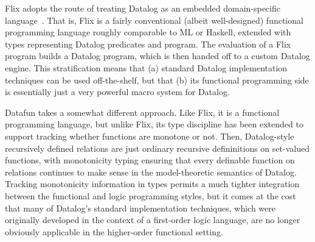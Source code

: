 %
%
%
%
%
%
%
Flix adopts the route of treating Datalog as an embedded
domain-specific language~\cite{edsl}. That is, Flix is a fairly conventional
(albeit well-designed) functional programming language roughly
comparable to ML or Haskell, extended with types representing Datalog
predicates and program. The evaluation of a Flix program builds a
Datalog program, which is then handed off to a custom Datalog engine.
This stratification means that (a) standard Datalog implementation
techniques can be used off-the-shelf, but that (b) its functional
programming side is essentially just a very powerful macro system for
Datalog.

Datafun takes a somewhat different approach. Like Flix, it is a
functional programming language, but unlike Flix, its type discipline
has been extended to support tracking whether functions are monotone
or not. Then, Datalog-style recursively defined relations are just
ordinary recursive defininitions on set-valued functions, with
monotonicity typing ensuring that every definable function on
relations continues to make sense in the model-theoretic semantics of
Datalog. Tracking monotonicity information in types permits a much
tighter integration between the functional and logic programming
styles, but it comes at the cost that many of Datalog's standard
implementation techniques, which were originally developed in the
context of a first-order logic language, are no longer obviously
applicable in the higher-order functional setting.

